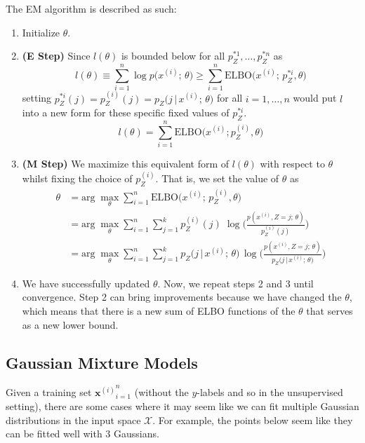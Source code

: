 \begin{definition}
    The EM algorithm is described as such: 
    \begin{enumerate}
      \item Initialize $\theta$.
      \item \textbf{(E Step)} Since $l(\theta)$ is bounded below for all $p_Z^{*1}, \ldots, p_Z^{*n}$ as 
        \[l(\theta) \equiv \sum_{i=1}^n \log p\big( x^{(i)}; \, \theta\big) \geq \sum_{i=1}^n \text{ELBO}\big( x^{(i)}; \, p_Z^{*i}, \theta\big)\]
      setting $p_Z^{*i} (j) = p_Z^{(i)} (j) = p_Z \big(j\,|\, x^{(i)}; \, \theta\big)$ for all $i = 1, \ldots, n$ would put $l$ into a new form for these specific fixed values of $p_Z^{*i}$. 
        \[l(\theta) = \sum_{i=1}^n \text{ELBO}\big(x^{(i)}; p_Z^{(i)}, \theta \big)\]
      \item \textbf{(M Step)} We maximize this equivalent form of $l(\theta)$ with respect to $\theta$ whilst fixing the choice of $p_Z^{(i)}$. That is, we set the value of $\theta$ as 
      \begin{align*}  
        \theta & = \text{arg}\; \max_\theta \sum_{i=1}^n \text{ELBO} \big( x^{(i)}; \, p_Z^{(i)}, \theta \big) \\
        & = \text{arg}\; \max_\theta \sum_{i=1}^n \sum_{j=1}^k p_Z^{(i)} (j)\; \log \bigg( \frac{p(x^{(i)}, Z = j; \, \theta)}{p_Z^{(i)} (j)} \bigg) \\
        & = \text{arg}\; \max_\theta \sum_{i=1}^n \sum_{j = 1}^k p_Z \big(j\,|\, x^{(i)}; \, \theta \big)\, \log \bigg( \frac{p(x^{(i)}, Z = j; \, \theta)}{p_Z \big(j\,|\, x^{(i)}; \, \theta \big)} \bigg)
      \end{align*}
      \item We have successfully updated $\theta$. Now, we repeat steps 2 and 3 until convergence. Step 2 can bring improvements because we have changed the $\theta$, which means that there is a new sum of ELBO functions of the $\theta$ that serves as a new lower bound.
    \end{enumerate}
  \end{definition}

\subsection{Gaussian Mixture Models}

  Given a training set ${\mathbf{x}^{(i)}}_{i=1}^n$ (without the $y$-labels and so in the unsupervised setting), there are some cases where it may seem like we can fit multiple Gaussian distributions in the input space $\mathcal{X}$. For example, the points below seem like they can be fitted well with 3 Gaussians.

